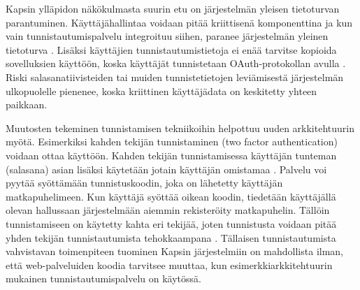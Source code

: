Kapsin ylläpidon näkökulmasta suurin etu on järjestelmän yleisen tietoturvan parantuminen. Käyttäjähallintaa voidaan pitää kriittisenä komponenttina ja kun vain tunnistautumispalvelu integroituu siihen, paranee järjestelmän yleinen tietoturva \cite{arkkitehtuurit}. Lisäksi käyttäjien tunnistautumistietoja ei enää tarvitse kopioida sovelluksien käyttöön, koska käyttäjät tunnistetaan OAuth-protokollan avulla \cite{oauth2_0}. Riski salasanatiivisteiden tai muiden tunnistetietojen leviämisestä järjestelmän ulkopuolelle pienenee, koska kriittinen käyttäjädata on keskitetty yhteen paikkaan.

Muutosten tekeminen tunnistamisen tekniikoihin helpottuu uuden arkkitehtuurin myötä. Esimerkiksi kahden tekijän tunnistaminen (two factor authentication) voidaan ottaa käyttöön. Kahden tekijän tunnistamisessa käyttäjän tunteman (salasana) asian lisäksi käytetään jotain käyttäjän omistamaa \cite{nisti}. Palvelu voi pyytää syöttämään tunnistuskoodin, joka on lähetetty käyttäjän matkapuhelimeen. Kun käyttäjä syöttää oikean koodin, tiedetään käyttäjällä olevan hallussaan järjestelmään aiemmin rekisteröity matkapuhelin. Tällöin tunnistamiseen on käytetty kahta eri tekijää, joten tunnistusta voidaan pitää yhden tekijän tunnistautumista tehokkaampana \cite{nisti}. Tällaisen tunnistautumista vahvistavan toimenpiteen tuominen Kapsin järjestelmiin on mahdollista ilman, että web-palveluiden koodia tarvitsee muuttaa, kun esimerkkiarkkitehtuurin mukainen tunnistautumispalvelu on käytössä.